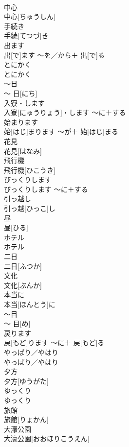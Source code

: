 \documentclass[8pt]{extreport}
\begin{document}
\begin{CJK}{UTF8}{min}
\\	中心	
\\	中心[ちゅうしん]		
\\	手続き	
\\	手続[てつづ]き		
\\	出ます	
\\	出[で]ます	〜を／から＋ 出[で]る	
\\	とにかく	
\\	とにかく		
\\	〜日	
\\	〜 日[にち]		
\\	入寮・します	
\\	入寮[にゅうりょう]・します	〜に＋する	
\\	始まります	
\\	始[はじ]まります	〜が＋ 始[はじ]まる	
\\	花見	
\\	花見[はなみ]		
\\	飛行機	
\\	飛行機[ひこうき]		
\\	びっくりします	
\\	びっくりします	〜に＋する	
\\	引っ越し	
\\	引っ越[ひっこ]し		
\\	昼	
\\	昼[ひる]		
\\	ホテル	
\\	ホテル		
\\	二日	
\\	二日[ふつか]		
\\	文化	
\\	文化[ぶんか]		
\\	本当に	
\\	本当[ほんとう]に		
\\	〜目	
\\	〜 目[め]		
\\	戻ります	
\\	戻[もど]ります	〜に＋ 戻[もど]る	
\\	やっぱり／やはり	
\\	やっぱり／やはり		
\\	夕方	
\\	夕方[ゆうがた]		
\\	ゆっくり	
\\	ゆっくり		
\\	旅館	
\\	旅館[りょかん]		
\\	大濠公園	
\\	大濠公園[おおほりこうえん]		

\end{CJK}
\end{document}
